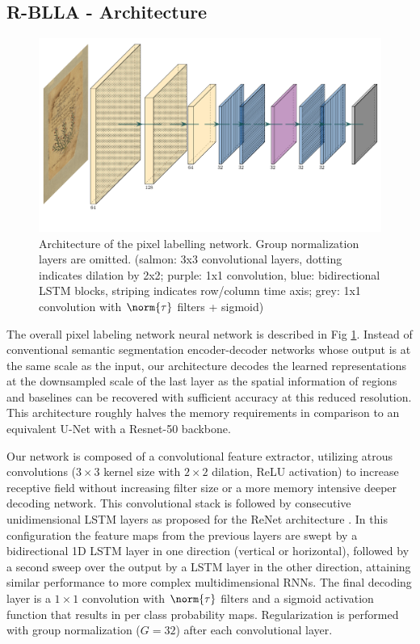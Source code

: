 \subsection{R-BLLA - Architecture}

\begin{figure}[ht]
        \centering
        \includegraphics[width=\textwidth]{rblla}
	\caption{Architecture of the pixel labelling network. Group
	normalization layers are omitted. (salmon: 3x3 convolutional layers,
	dotting indicates dilation by 2x2; purple: 1x1 convolution, blue:
	bidirectional LSTM blocks, striping indicates row/column time axis;
	grey: 1x1 convolution with $\norm{\tau}$ filters + sigmoid)}
	\label{fig:rblla}
\end{figure}

The overall pixel labeling network neural network is described in Fig
\ref{fig:rblla}. Instead of conventional semantic segmentation encoder-decoder
networks whose output is at the same scale as the input, our architecture
decodes the learned representations at the downsampled scale of the last layer
as the spatial information of regions and baselines can be recovered with
sufficient accuracy at this reduced resolution. This architecture roughly
halves the memory requirements in comparison to an equivalent U-Net with a
Resnet-50 backbone.

Our network is composed of a convolutional feature extractor, utilizing atrous
convolutions ($3 \times 3$ kernel size with $2 \times 2$ dilation, ReLU
activation) to increase receptive field without increasing filter size or a
more memory intensive deeper decoding network. This convolutional stack is
followed by consecutive unidimensional LSTM layers as proposed for the ReNet
architecture \cite{visin2015renet}. In this configuration the feature maps from
the previous layers are swept by a bidirectional 1D LSTM layer in one direction
(vertical or horizontal), followed by a second sweep over the output by a LSTM
layer in the other direction, attaining similar performance to more complex
multidimensional RNNs. The final decoding layer is a $1\times 1$ convolution
with $\norm{\tau}$ filters and a sigmoid activation function that results in
per class probability maps.  Regularization is performed with group
normalization ($G=32$) \cite{DBLP:journals/corr/abs-1803-08494} after each
convolutional layer.


